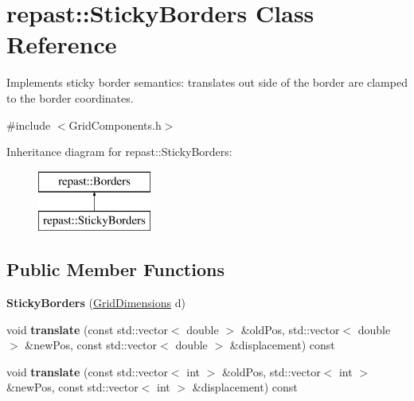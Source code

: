 \hypertarget{classrepast_1_1_sticky_borders}{\section{repast\-:\-:Sticky\-Borders Class Reference}
\label{classrepast_1_1_sticky_borders}
}


Implements sticky border semantics\-: translates out side of the border are clamped to the border coordinates.  




{\ttfamily \#include $<$Grid\-Components.\-h$>$}

Inheritance diagram for repast\-:\-:Sticky\-Borders\-:\begin{figure}[H]
\begin{center}
\leavevmode
\includegraphics[height=2.000000cm]{classrepast_1_1_sticky_borders}
\end{center}
\end{figure}
\subsection*{Public Member Functions}
\begin{DoxyCompactItemize}
\item 
\hypertarget{classrepast_1_1_sticky_borders_a8fed977a5c268aae7c55c08c7a67961f}{{\bfseries Sticky\-Borders} (\hyperlink{classrepast_1_1_grid_dimensions}{Grid\-Dimensions} d)}\label{classrepast_1_1_sticky_borders_a8fed977a5c268aae7c55c08c7a67961f}

\item 
\hypertarget{classrepast_1_1_sticky_borders_a08dd5b0698aa0c33581ac7b86d087879}{void {\bfseries translate} (const std\-::vector$<$ double $>$ \&old\-Pos, std\-::vector$<$ double $>$ \&new\-Pos, const std\-::vector$<$ double $>$ \&displacement) const }\label{classrepast_1_1_sticky_borders_a08dd5b0698aa0c33581ac7b86d087879}

\item 
\hypertarget{classrepast_1_1_sticky_borders_a522b9f9cdc33724c60d8ea879dd97429}{void {\bfseries translate} (const std\-::vector$<$ int $>$ \&old\-Pos, std\-::vector$<$ int $>$ \&new\-Pos, const std\-::vector$<$ int $>$ \&displacement) const }\label{classrepast_1_1_sticky_borders_a522b9f9cdc33724c60d8ea879dd97429}

\end{DoxyCompactItemize}
